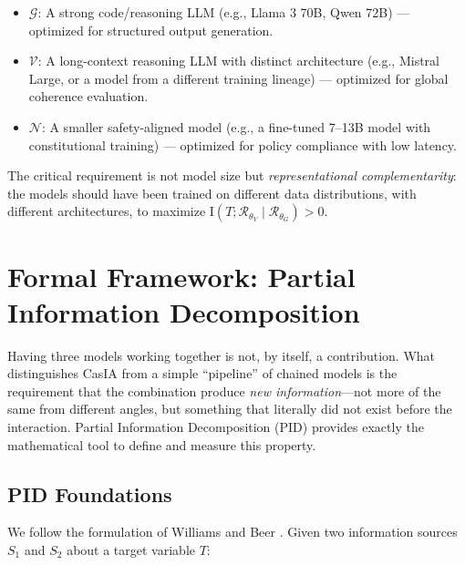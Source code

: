 \documentclass[11pt,a4paper]{article}
\theoremstyle{remark}
\newcommand{\MI}{\mathrm{I}}
\begin{document}
\begin{itemize}
  \item $\mathcal{G}$: A strong code/reasoning LLM (e.g., Llama 3 70B, Qwen 72B) --- optimized for structured output generation.
  \item $\mathcal{V}$: A long-context reasoning LLM with distinct architecture (e.g., Mistral Large, or a model from a different training lineage) --- optimized for global coherence evaluation.
  \item $\mathcal{N}$: A smaller safety-aligned model (e.g., a fine-tuned 7--13B model with constitutional training) --- optimized for policy compliance with low latency.
\end{itemize}

The critical requirement is not model size but \emph{representational complementarity}: the models should have been trained on different data distributions, with different architectures, to maximize $\MI(T; \mathcal{R}_{\theta_V} \mid \mathcal{R}_{\theta_G}) > 0$.

\section{Formal Framework: Partial Information Decomposition}
\label{sec:formal}

Having three models working together is not, by itself, a contribution. What distinguishes CasIA from a simple ``pipeline'' of chained models is the requirement that the combination produce \emph{new information}---not more of the same from different angles, but something that literally did not exist before the interaction. Partial Information Decomposition (PID) provides exactly the mathematical tool to define and measure this property.

\subsection{PID Foundations}

We follow the formulation of Williams and Beer \cite{williams2010pid}. Given two information sources $S_1$ and $S_2$ about a target variable $T$:
\end{document}
